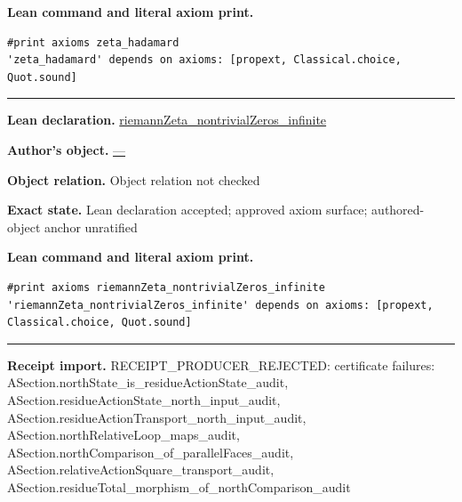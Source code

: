 \documentclass[11pt]{article}
\theoremstyle{plain}
\theoremstyle{definition}
\theoremstyle{remark}
\begin{document}
\begin{tcolorbox}
\par\smallskip\textbf{Lean command and literal axiom print.}
\begin{Verbatim}[breaklines=true,breakanywhere=true,fontsize=\small]
#print axioms zeta_hadamard
'zeta_hadamard' depends on axioms: [propext, Classical.choice, Quot.sound]
\end{Verbatim}
\medskip\hrule\medskip
\textbf{Lean declaration.} \url{riemannZeta_nontrivialZeros_infinite}
\par\textbf{Author's object.} \url{—}
\par\textbf{Object relation.} Object relation not checked
\par\textbf{Exact state.} Lean declaration accepted; approved axiom surface; authored-object anchor unratified
\par\smallskip\textbf{Lean command and literal axiom print.}
\begin{Verbatim}[breaklines=true,breakanywhere=true,fontsize=\small]
#print axioms riemannZeta_nontrivialZeros_infinite
'riemannZeta_nontrivialZeros_infinite' depends on axioms: [propext, Classical.choice, Quot.sound]
\end{Verbatim}
\medskip\hrule\medskip
\textbf{Receipt import.} \textcolor{KgtRed}{RECEIPT\_PRODUCER\_REJECTED: certificate failures: ASection.northState\_is\_residueActionState\_audit, ASection.residueActionState\_north\_input\_audit, ASection.residueActionTransport\_north\_input\_audit, ASection.northRelativeLoop\_maps\_audit, ASection.northComparison\_of\_parallelFaces\_audit, ASection.relativeActionSquare\_transport\_audit, ASection.residueTotal\_morphism\_of\_northComparison\_audit}
\end{tcolorbox}
\medskip
\end{document}
